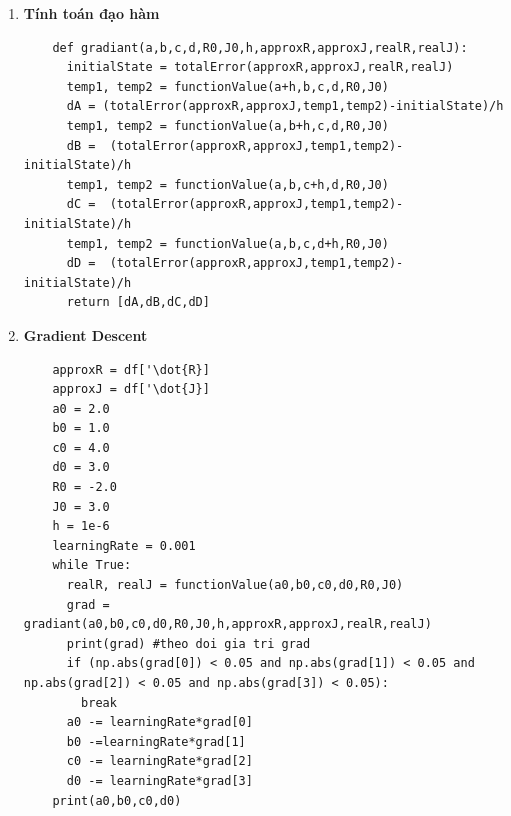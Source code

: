 \documentclass[a4paper]{article}
\begin{document}
\begin{enumerate}
\begin{lstlisting}
    \end{lstlisting}
    \item \textbf{Tính toán đạo hàm}
    \begin{lstlisting}
    def gradiant(a,b,c,d,R0,J0,h,approxR,approxJ,realR,realJ):
      initialState = totalError(approxR,approxJ,realR,realJ)
      temp1, temp2 = functionValue(a+h,b,c,d,R0,J0)
      dA = (totalError(approxR,approxJ,temp1,temp2)-initialState)/h
      temp1, temp2 = functionValue(a,b+h,c,d,R0,J0)
      dB =  (totalError(approxR,approxJ,temp1,temp2)-initialState)/h
      temp1, temp2 = functionValue(a,b,c+h,d,R0,J0)
      dC =  (totalError(approxR,approxJ,temp1,temp2)-initialState)/h
      temp1, temp2 = functionValue(a,b,c,d+h,R0,J0)
      dD =  (totalError(approxR,approxJ,temp1,temp2)-initialState)/h
      return [dA,dB,dC,dD]
    \end{lstlisting}
    \item \textbf{Gradient Descent}
    \begin{lstlisting}
    approxR = df['\dot{R}]
    approxJ = df['\dot{J}]
    a0 = 2.0
    b0 = 1.0
    c0 = 4.0
    d0 = 3.0
    R0 = -2.0
    J0 = 3.0
    h = 1e-6
    learningRate = 0.001
    while True:
      realR, realJ = functionValue(a0,b0,c0,d0,R0,J0)
      grad = gradiant(a0,b0,c0,d0,R0,J0,h,approxR,approxJ,realR,realJ)
      print(grad) #theo doi gia tri grad
      if (np.abs(grad[0]) < 0.05 and np.abs(grad[1]) < 0.05 and np.abs(grad[2]) < 0.05 and np.abs(grad[3]) < 0.05):
        break
      a0 -= learningRate*grad[0]
      b0 -=learningRate*grad[1]
      c0 -= learningRate*grad[2]
      d0 -= learningRate*grad[3]
    print(a0,b0,c0,d0)
    \end{lstlisting}
\end{enumerate}
\end{document}
